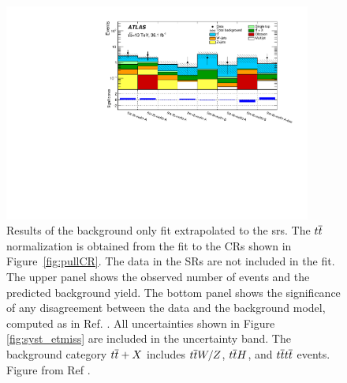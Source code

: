 \begin{figure}[htbp]
	\centering
	\includegraphics[width=0.9\textwidth]{figures/ewk_prod/etmiss_results/histpull_pulls_in_SR_qcdStrong}
	\caption{Results of the background only fit extrapolated to the \glspl{sr}. 
	The $t\overline{t}$ normalization is obtained from the fit to the CRs shown in Figure~\ref{fig:pullCR}. The data in the  SRs are 
	not included in the fit.  The upper panel shows the observed number of events and the predicted background 
	yield.  The bottom panel shows the significance of any disagreement between the data and the background model, computed as in Ref. \cite{Choudalakis:2011okv}. All uncertainties  shown in Figure \ref{fig:syst_etmiss} are included in the uncertainty band. 
	The background
	category $t\overline{t}+X$ includes $t\overline{t} W/Z$, $t\overline{t} H$, and $t\overline{t} t\overline{t}$ events. Figure from Ref \cite{Aaboud:2018htj}.} 
	\label{fig:ewk:pullSR}
\end{figure}

